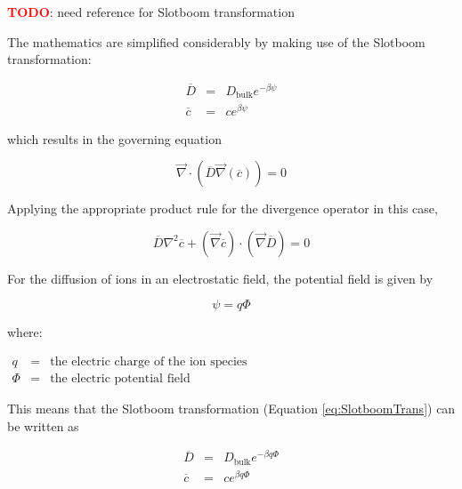 \textcolor{red}{\textbf{TODO}}: need reference for Slotboom transformation

The mathematics are simplified considerably by making use of the Slotboom transformation:

\begin{equation}\label{eq:SlotboomTrans}
  \begin{array}{rcl}
    \overline{D} & = & D_{\mathrm{bulk}} e^{-\beta \psi} \\
    \overline{c} & = & c e^{\beta \psi}
  \end{array}
\end{equation}

which results in the governing equation

\begin{equation}
  \vec{\nabla} \cdot \left( \overline{D} \vec{\nabla} \left( \overline{c} \right) \right) = 0
\end{equation}

Applying the appropriate product rule for the divergence operator in this case,

\begin{equation}\label{eq:SmolSlotboomDiff}
  \boxed{
    \overline{D} \nabla^2 \overline{c} + \left( \vec{\nabla} \overline{c} \right) \cdot \left( \vec{\nabla} \overline{D} \right) = 0
  }
\end{equation}

For the diffusion of ions in an electrostatic field, the potential field is given by

\begin{equation}
  \psi=q \Phi
\end{equation}

where:

$\begin{array}{rcl}
q & = & \text{the electric charge of the ion species} \\
\Phi & = & \text{the electric potential field}
\end{array}$

This means that the Slotboom transformation (Equation \ref{eq:SlotboomTrans}) can be written as

\begin{equation}\label{eq:SlotboomTransWithQ}
  \begin{array}{rcl}
    \overline{D} & = & D_{\mathrm{bulk}} e^{-\beta q \Phi} \\
    \overline{c} & = & c e^{\beta q \Phi}
  \end{array}
\end{equation}


